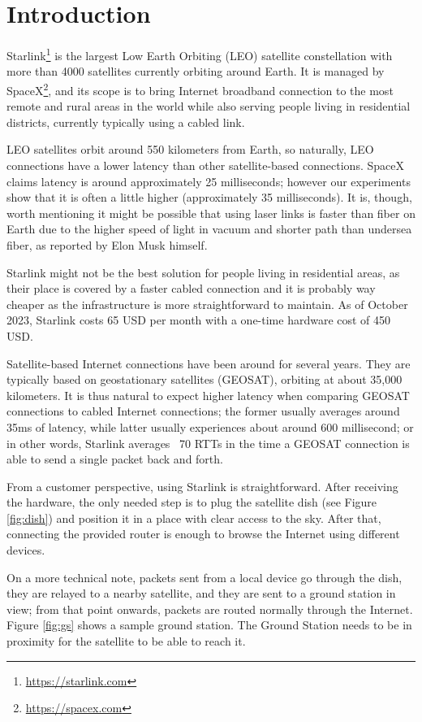 \documentclass[IN,11pt,twoside,openright,idp,english]{tumthesis}
\begin{document}
\section{Introduction}
    
Starlink\footnote{\url{https://starlink.com}} is the largest Low Earth Orbiting (LEO) satellite constellation with more
than 4000 satellites currently orbiting around Earth. It is managed by SpaceX\footnote{\url{https://spacex.com}}, and
its scope is to bring Internet broadband connection to the most remote and rural areas in the world while also serving
people living in residential districts, currently typically using a cabled link.
    
LEO satellites orbit around 550 kilometers from Earth, so naturally, LEO connections have a lower latency than other
satellite-based connections. SpaceX claims latency is around approximately 25 milliseconds; however our experiments show
that it is often a little higher (approximately 35 milliseconds). It is, though, worth mentioning it might be possible
that using laser links is faster than fiber on Earth due to the higher speed of light in vacuum and shorter path than
undersea fiber, as reported by Elon Musk himself\cite{tweet}.

Starlink might not be the best solution for people living in residential areas, as their place is covered by a faster
cabled connection and it is probably way cheaper as the infrastructure is more straightforward to maintain. As of
October 2023, Starlink costs 65 USD per month with a one-time hardware cost of 450 USD. 

Satellite-based Internet connections have been around for several years. They are typically based on geostationary
satellites (GEOSAT), orbiting at about 35,000 kilometers. It is thus natural to expect higher latency when comparing
GEOSAT connections to cabled Internet connections; the former usually averages around 35ms of latency, while latter
usually experiences about around 600 millisecond; or in other words, Starlink averages ~70 RTTs in the time a
GEOSAT connection is able to send a single packet back and forth.
    
From a customer perspective, using Starlink is straightforward. After receiving the hardware, the only needed step is to
plug the satellite dish (see Figure \ref{fig:dish}) and position it in a place with clear access to the sky. After that,
connecting the provided router is enough to browse the Internet using different devices.
    
On a more technical note, packets sent from a local device go through the dish, they are relayed to a nearby satellite,
and they are sent to a ground station in view; from that point onwards, packets are routed normally through the
Internet. Figure \ref{fig:gs} shows a sample ground station. The Ground Station needs to be in proximity for the
satellite to be able to reach it.   
    
\end{document}
